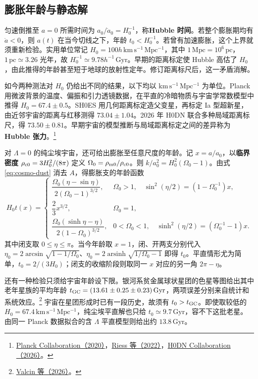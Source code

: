 \subsection{膨胀年龄与静态解}

匀速倒推至 $a=0$ 所需时间为 $a_0/\dot a_0=H_0^{-1}$，称\textbf{Hubble 时间}。若整个膨胀期均有 $\ddot a<0$，则 $a(t)$ 在当今切线之下，年龄 $t_0<H_0^{-1}$。若曾有加速膨胀，这个上界就须重新检验。实用单位常记 $H_0=100h\,\mathrm{km\,s^{-1}\,Mpc^{-1}}$，其中 $1\,\mathrm{Mpc}=10^6\,\mathrm{pc}$，$1\,\mathrm{pc}\simeq3.26$ 光年，故 $H_0^{-1}\simeq9.78h^{-1}\,\mathrm{Gyr}$。早期的距离标定使 Hubble 高估了 $H_0$，由此推得的年龄甚至短于地球的放射性定年。修订距离标尺后，这一矛盾消解。

如今两种测法对 $H_0$ 仍给出不同的结果，以下均以 $\mathrm{km\,s^{-1}\,Mpc^{-1}}$ 为单位。Planck 用微波背景的温度、偏振和引力透镜数据，在平直的冷暗物质与宇宙学常数模型中推得 $H_0=67.4\pm0.5$。SH0ES 用几何距离标定造父变星，再标定 Ia 型超新星，由近邻宇宙的距离与红移测得 $73.04\pm1.04$。2026 年 H0DN 联合多种局域距离标尺，得 $73.50\pm0.81$。早期宇宙的模型推断与局域距离标定之间的差异称为\textbf{Hubble 张力}。\footnote{\href{https://doi.org/10.1051/0004-6361/201833910}{Planck Collaboration（2020）}，\href{https://doi.org/10.3847/2041-8213/ac5c5b}{Riess 等（2022）}，\href{https://doi.org/10.1051/0004-6361/202557993}{H0DN Collaboration（2026）}。}

对 $\Lambda=0$ 的纯尘埃宇宙，还可给出膨胀至任意尺度的年龄。记 $x=a/a_0$，以\textbf{临界密度} $\rho_{\rm c0}=3H_0^2/(8\pi)$ 定义 $\Omega_0=\rho_{\rm m0}/\rho_{\rm c0}$。则 $k/a_0^2=H_0^2(\Omega_0-1)$。由式 \eqref{eq:cosmo-dust} 消去 $A$，得膨胀支的年龄函数
\[
    H_0 t(x)=
    \begin{cases}
        \dfrac{\Omega_0(\eta-\sin\eta)}{2(\Omega_0-1)^{3/2}},
        & \Omega_0>1,\quad
          \sin^2(\eta/2)=(1-\Omega_0^{-1})x,\\[5pt]
        \dfrac23 x^{3/2}, & \Omega_0=1,\\[5pt]
        \dfrac{\Omega_0(\sinh\eta-\eta)}{2(1-\Omega_0)^{3/2}},
        & 0<\Omega_0<1,\quad
          \sinh^2(\eta/2)=(\Omega_0^{-1}-1)x .
    \end{cases}
\]
其中闭支取 $0\leqslant\eta\leqslant\pi$。当今年龄取 $x=1$，闭、开两支分别代入 $\eta_0=2\arcsin\sqrt{1-1/\Omega_0}$、$\eta_0=2\operatorname{arsinh}\sqrt{1/\Omega_0-1}$ 即得 $t_0$。平直情形尤为简单，$t_0=2/(3H_0)$；闭支的收缩阶段则取同一 $x$ 对应的另一角 $2\pi-\eta$。

还有一种检验只须给宇宙年龄设下限。银河系贫金属球状星团的色星等图给出其中老年星族的平均年龄 $t_{\rm GC}=(13.61\pm0.25\pm0.23)\,\mathrm{Gyr}$，两项误差分别来自统计和系统效应。\footnote{\href{https://arxiv.org/abs/2603.04872}{Valcin 等（2026）}。} 宇宙在星团形成时已有一段历史，故须有 $t_0>t_{\rm GC}$。即使取较低的 $H_0=67.4\,\mathrm{km\,s^{-1}\,Mpc^{-1}}$，纯尘埃平直解也只给 $t_0\simeq9.7\,\mathrm{Gyr}$，容不下这批老星。由同一 Planck 数据拟合的含 $\Lambda$ 平直模型则给出约 $13.8\,\mathrm{Gyr}$。

